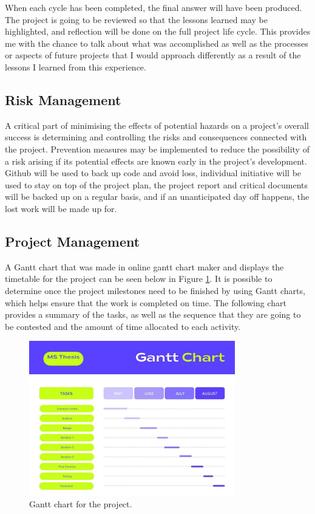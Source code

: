 When each cycle has been completed, the final answer will have been produced. The project is going to be reviewed so that the lessons learned may be highlighted, and reflection will be done on the full project life cycle. This provides me with the chance to talk about what was accomplished as well as the processes or aspects of future projects that I would approach differently as a result of the lessons I learned from this experience.

\subsection{Risk Management}
A critical part of minimising the effects of potential hazards on a project's overall success is determining and controlling the risks and consequences connected with the project. Prevention measures may be implemented to reduce the possibility of a risk arising if its potential effects are known early in the project's development. Github will be used to back up code and avoid loss, individual initiative will be used to stay on top of the project plan, the project report and critical documents will be backed up on a regular basis, and if an unanticipated day off happens, the lost work will be made up for.

\subsection{Project Management}
A Gantt chart that was made in online gantt chart maker and displays the timetable for the project can be seen below in Figure \ref{fig:3}. It is possible to determine once the project milestones need to be finished by using Gantt charts, which helps ensure that the work is completed on time. The following chart provides a summary of the tasks, as well as the sequence that they are going to be contested and the amount of time allocated to each activity.

\begin{figure}[h!]
	\centering
	\includegraphics[width=0.8\textwidth]{gantt}
	\caption{Gantt chart for the project.}
	\label{fig:3}
\end{figure}

\def\baselinestretch{1.66}
\medskip

